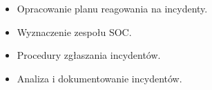 \begin{itemize}
    \item Opracowanie planu reagowania na incydenty.
    \item Wyznaczenie zespołu SOC.
    \item Procedury zgłaszania incydentów.
    \item Analiza i dokumentowanie incydentów.
\end{itemize}